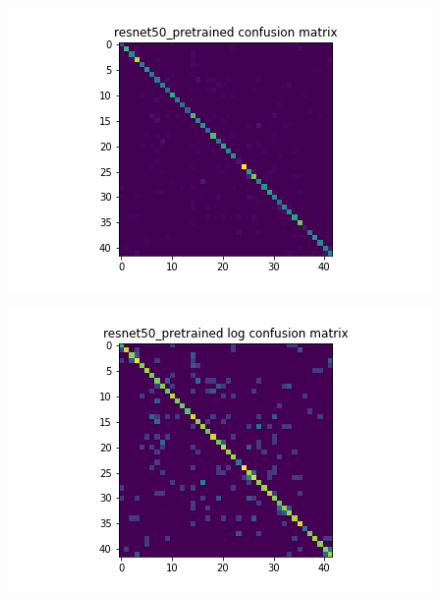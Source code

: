 \begin{figure}[H]
  \begin{minipage}[b]{.5\linewidth}
    \centering
    {\includegraphics[width=1.2\textwidth]{figs/conf_matrix/resnet50_pretrained_conf.png}}
  \end{minipage}
  \hfill
  \begin{minipage}[b]{.5\linewidth}
    \centering

    {\includegraphics[width=1.2\textwidth]{figs/conf_matrix/resnet50_pretrained_log_conf.png}}
  \end{minipage}
  \vfill
  \begin{minipage}[b]{.5\linewidth}
    \centering


\end{minipage}
\end{figure}
